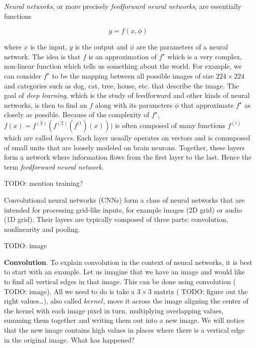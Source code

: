 \textit{Neural networks}, or more precisely \textit{feedforward neural networks}, are essentially functions

\begin{equation}
    \label{eq:neural_network}
    y = f(x, \phi)
\end{equation}

where \(x\) is the input, \(y\) is the output and \(\phi\) are the parameters of a neural network. The idea is that \(f\) is an approximation of \(f^\star\) which is a very complex, non-linear function which tells us something about the world. For example, we can consider \(f^\star\) to be the mapping between all possible images of size \(224 \times 224\) and categories such as dog, cat, tree, house, etc. that describe the image. The goal of \textit{deep learning}, which is the study of feedforward and other kinds of neural networks, is then to find an \(f\) along with its parameters \(\phi\) that approximate \(f^\star\) as closely as possible. Because of the complexity of \(f^\star\), \(f(x) = f^{(3)}(f^{(2)}(f^{(1})(x)))\) is often composed of many functions \(f^{(i)}\) which are called \textit{layers}. Each layer usually operates on vectors and is commposed of small units that are loosely modeled on brain neurons. Together, these layers form a network where information flows from the first layer to the last. Hence the term \textit{feedforward neural network}.

{\color{red} TODO: mention training?}

Convolutional neural networks (CNNs) form a class of neural networks that are intended for processing grid-like inputs, for example images (2D grid) or audio (1D grid). Their layers are typically composed of three parts: convolution, nonlinearity and pooling.

{\color{red} TODO: image}

\textbf{Convolution}. To explain convolution in the context of neural networks, it is best to start with an example. Let us imagine that we have an image and would like to find all vertical edges in that image. This can be done using convolution ({\color{red} TODO: image}). All we need to do is take a \(3 \times 3\) matrix ({\color{red} TODO: figure out the right values\dots}), also called \(kernel\), move it across the image aligning the center of the kernel with each image pixel in turn, multiplying overlapping values, summing them together and writing them out into a new image. We will notice that the new image contains high values in places where there is a vertical edge in the original image. What has happened?

